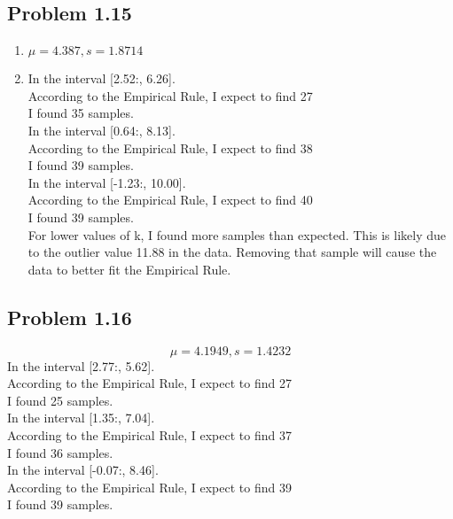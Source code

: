 \documentclass[12pt]{article}
\begin{document}
\subsection*{Problem 1.15}
    \begin{enumerate}[label=(\alph*).]
        \item $\mu = 4.387, s = 1.8714$
        
        \item In the interval [2.52:, 6.26].\\
        According to the Empirical Rule, I expect to find 27\\
        I found 35 samples.\\
        
        
        In the interval [0.64:, 8.13].\\
        According to the Empirical Rule, I expect to find 38\\
        I found 39 samples.\\
        
        
        In the interval [-1.23:, 10.00].\\
        According to the Empirical Rule, I expect to find 40\\
        I found 39 samples.\\
        
        For lower values of k, I found more samples than expected. This is likely due to the outlier value 11.88 in the data. Removing that sample will cause the data to better fit the Empirical Rule.
        
    \end{enumerate}

\subsection*{Problem 1.16}
    \[ \mu = 4.1949, s = 1.4232 \]
    \noindent
    In the interval [2.77:, 5.62].\\
    According to the Empirical Rule, I expect to find 27 \\
    I found 25 samples.\\
    
    \noindent
    In the interval [1.35:, 7.04].\\
    According to the Empirical Rule, I expect to find 37\\
    I found 36 samples.\\
    
    \noindent
    In the interval [-0.07:, 8.46].\\
    According to the Empirical Rule, I expect to find 39\\
    I found 39 samples.\\
    
\end{document}
